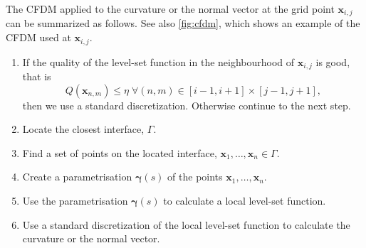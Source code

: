 \documentclass[11pt,b5paper,DIV=calc,BCOR1.3cm,headings=small,%
               footinclude=false,headsepline]{scrbook}
\newcommand*{\vct}[1]{\ensuremath{\boldsymbol{#1}}}
\begin{document}
The CFDM applied to the curvature or the normal vector at the grid point $\vct
x_{i,j}$ can be summarized as follows.  See also \cref{fig:cfdm}, which shows
an example of the CFDM used at $\vct x_{i,j}$.
\begin{enumerate}
  \item If the quality of the level-set function in the neighbourhood of $\vct
    x_{i,j}$ is good, that is
    \[
      Q(\vct{x}_{n,m}) \le \eta \; \forall (n,m) \in [i-1,i+1]\times[j-1,j+1],
    \]
    then we use a standard discretization.  Otherwise continue to the next
    step.
  \item Locate the closest interface, $\Gamma$.
  \item Find a set of points on the located interface, $\vct x_1, \dots, \vct
    x_n \in \Gamma$.
  \item Create a parametrisation $\vct \gamma(s)$ of the points $\vct x_1,
    \dots, \vct x_n$.
  \item Use the parametrisation $\vct \gamma(s)$ to calculate a local level-set
    function.
  \item Use a standard discretization of the local level-set function to
    calculate the curvature or the normal vector.
\end{enumerate}
\end{document}
